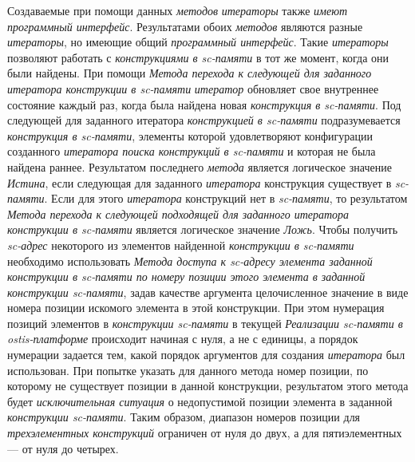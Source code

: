 Создаваемые при помощи данных \textit{методов} \textit{итераторы} также \textit{имеют программный интерфейс}. Результатами обоих \textit{методов} являются разные \textit{итераторы}, но имеющие общий \textit{программный интерфейс}. Такие \textit{итераторы} позволяют работать с \textit{конструкциями в sc-памяти} в тот же момент, когда они были найдены. При помощи \textit{Метода перехода к следующей  для заданного итератора конструкции в sc-памяти} \textit{итератор} обновляет свое внутреннее состояние каждый раз, когда была найдена новая \textit{конструкция в sc-памяти}. Под следующей  для заданного итератора \textit{конструкцией в sc-памяти} подразумевается \textit{конструкция в sc-памяти}, элементы которой удовлетворяют конфигурации созданного \textit{итератора поиска конструкций в sc-памяти} и которая не была найдена раннее. Результатом последнего \textit{метода} является логическое значение \textit{Истина}, если следующая  для заданного \textit{итератора} конструкция существует в \textit{sc-памяти}. Если  для этого \textit{итератора} конструкций нет в \textit{sc-памяти}, то результатом \textit{Метода перехода к следующей подходящей для заданного итератора конструкции в sc-памяти} является логическое значение \textit{Ложь}. Чтобы получить \textit{sc-адрес} некоторого из элементов найденной \textit{конструкции в sc-памяти} необходимо использовать \textit{Метода доступа к sc-адресу элемента заданной конструкции в sc-памяти по номеру позиции этого элемента в заданной конструкции sc-памяти}, задав качестве аргумента целочисленное значение в виде номера позиции искомого элемента в этой конструкции. При этом нумерация позиций элементов в \textit{конструкции sc-памяти} в текущей \textit{Реализации sc-памяти в ostis-платформе} происходит начиная с нуля, а не с единицы, а порядок нумерации задается тем, какой порядок аргументов для создания \textit{итератора} был использован. При попытке указать для данного метода номер позиции, по которому не существует позиции в данной конструкции, результатом этого метода будет \textit{исключительная ситуация} о недопустимой позиции элемента в заданной \textit{конструкции sc-памяти}. Таким образом, диапазон номеров позиции для \textit{трехэлементных конструкций} ограничен от нуля до двух, а для пятиэлементных --- от нуля до четырех.

